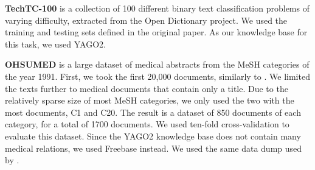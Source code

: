 \documentclass{article}
\theoremstyle{definition}
\begin{document}
\textbf{TechTC-100} \citep{gabrilovich2004text} is a collection of 100 different binary text classification problems of varying difficulty, extracted from the Open Dictionary project.
We used the training and testing sets defined in the original paper. 
As our knowledge base for this task, we used YAGO2.%




\textbf{OHSUMED} \citep{hersh1994ohsumed} is a large dataset of medical abstracts from the MeSH categories of the year 1991. 
First, we took the first 20,000 documents, similarly to \cite{joachims1998text}.
We limited the texts further to medical documents that contain only a title. %
Due to the relatively sparse size of most MeSH categories, we only used the two with the most documents, C1 and C20. %
The result is a dataset of 850 documents of each category, for a total of 1700 documents.
We used ten-fold cross-validation to evaluate this dataset.
Since the YAGO2 knowledge base does not contain many medical relations, we used Freebase instead. We used the same data dump used by \cite{bast2014easy}. 
\end{document}
